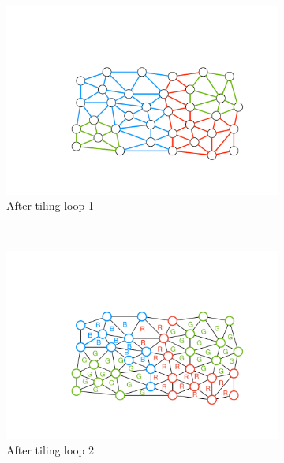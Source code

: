 \begin{figure}[h]
\centering
\begin{subfigure}[b]{0.33\textwidth}
\includegraphics[width=\textwidth]{sparsetiling/figures/loop_0_conflicts.pdf}
\caption{After tiling loop 1}
\label{fig:st-conflicts-a}
\end{subfigure}%
~ 
\begin{subfigure}[b]{0.33\textwidth}
\centering
\includegraphics[width=\textwidth]{sparsetiling/figures/loop_1_conflicts.pdf}
\caption{After tiling loop 2}
\label{fig:st-conflicts-b}
\end{subfigure}%
~
\begin{subfigure}[b]{0.34\textwidth}
\centering

\end{subfigure}
\end{figure}

